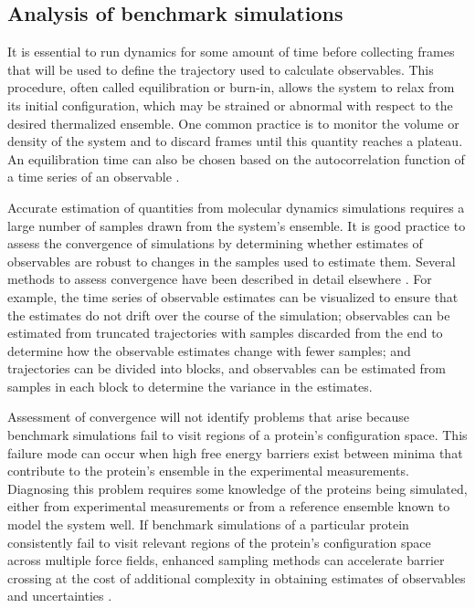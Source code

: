 \documentclass[9pt,review]{livecoms}
\begin{document}
\subsection{Analysis of benchmark simulations}
\label{sub:best_practices_analysis}

It is essential to run dynamics for some amount of time before collecting frames that will be used to define the trajectory used to calculate observables.
This procedure, often called equilibration or burn-in, allows the system to relax from its initial configuration, which may be strained or abnormal with respect to the desired thermalized ensemble.
One common practice is to monitor the volume or density of the system and to discard frames until this quantity reaches a plateau.
An equilibration time can also be chosen based on the autocorrelation function of a time series of an observable \cite{chodera_simple_2016}.

Accurate estimation of quantities from molecular dynamics simulations requires a large number of samples drawn from the system's ensemble.
It is good practice to assess the convergence of simulations by determining whether estimates of observables are robust to changes in the samples used to estimate them.
Several methods to assess convergence have been described in detail elsewhere \cite{grossfield_best_2019}.
For example, the time series of observable estimates can be visualized to ensure that the estimates do not drift over the course of the simulation; 
observables can be estimated from truncated trajectories with samples discarded from the end to determine how the observable estimates change with fewer samples;
and trajectories can be divided into blocks, and observables can be estimated from samples in each block to determine the variance in the estimates.

Assessment of convergence will not identify problems that arise because benchmark simulations fail to visit regions of a protein's configuration space.
This failure mode can occur when high free energy barriers exist between minima that contribute to the protein's ensemble in the experimental measurements.
Diagnosing this problem requires some knowledge of the proteins being simulated, either from experimental measurements or from a reference ensemble known to model the system well.
If benchmark simulations of a particular protein consistently fail to visit relevant regions of the protein's configuration space across multiple force fields, enhanced sampling methods \cite{henin_enhanced_2022} can accelerate barrier crossing at the cost of additional complexity in obtaining estimates of observables and uncertainties \cite{grossfield_best_2019}.
\end{document}
